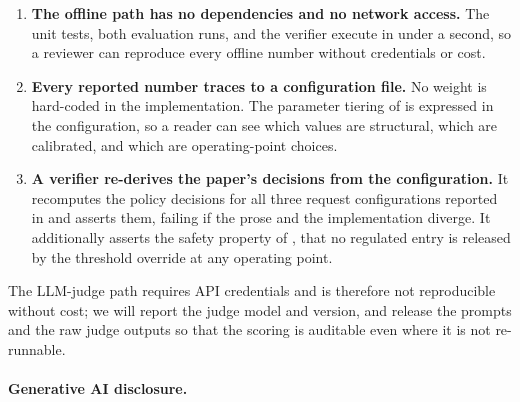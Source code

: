 \begin{enumerate}
  \item \textbf{The offline path has no dependencies and no network access.}
  The unit tests, both evaluation runs, and the verifier execute in under a
  second, so a reviewer can reproduce every offline number without credentials
  or cost.
  \item \textbf{Every reported number traces to a configuration file.} No
  weight is hard-coded in the implementation. The parameter tiering of
   is expressed in the configuration, so a reader can
  see which values are structural, which are calibrated, and which are
  operating-point choices.
  \item \textbf{A verifier re-derives the paper's decisions from the
  configuration.} It recomputes the policy decisions for all three request
  configurations reported in  and asserts them, failing if the
  prose and the implementation diverge. It additionally asserts the safety
  property of , that no regulated entry is released
  by the threshold override at any operating point.
\end{enumerate}

The LLM-judge path requires API credentials and is therefore not reproducible
without cost; we will report the judge model and version, and release the
prompts and the raw judge outputs so that the scoring is auditable even where
it is not re-runnable.

\paragraph{Generative AI disclosure.} 
